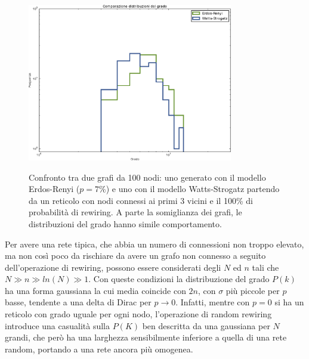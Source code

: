 \begin{figure}[b!]
	\centering
	$\;$
	\\
	\subfloat
	{\includegraphics[width=0.8\textwidth]{./Immagini/Teoria/ComparGradeModel}}
	\caption[Confronto grafi random.]{Confronto tra due grafi da 100 nodi: uno generato con il modello Erdos-Renyi ($p=7\%$) e uno con il modello Watts-Strogatz partendo da un reticolo con nodi connessi ai primi 3 vicini e il 100\% di probabilit\`a di rewiring. A parte la somiglianza dei grafi, le distribuzioni del grado hanno simile comportamento.}
	\label{fig:confrontorandom}
\end{figure}

Per avere una rete tipica, che abbia un numero di connessioni non troppo elevato, ma non così poco da rischiare da avere un grafo non connesso a seguito dell'operazione di rewiring, possono essere considerati degli $N$ ed $n$ tali che $N\gg n \gg ln(N) \gg 1$. Con queste condizioni la distribuzione del grado $P(k)$ ha una forma gaussiana la cui media coincide con $2n$, con $\sigma$ più piccole per $p$ basse, tendente a una delta di Dirac per $p \rightarrow 0$. Infatti, mentre con $p = 0$ si ha un reticolo con grado uguale per ogni nodo, l'operazione di random rewiring introduce una casualità sulla $P(K)$ ben descritta da una gaussiana per $N$ grandi, che però ha una larghezza sensibilmente inferiore a quella di una rete random, portando a una rete ancora più omogenea. 

